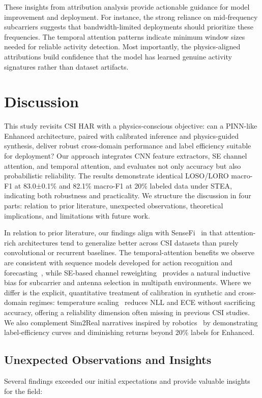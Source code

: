 \documentclass[journal]{IEEEtran}
\begin{document}
These insights from attribution analysis provide actionable guidance for model improvement and deployment. For instance, the strong reliance on mid-frequency subcarriers suggests that bandwidth-limited deployments should prioritize these frequencies. The temporal attention patterns indicate minimum window sizes needed for reliable activity detection. Most importantly, the physics-aligned attributions build confidence that the model has learned genuine activity signatures rather than dataset artifacts.

\section{Discussion}
This study revisits CSI HAR with a physics-conscious objective: can a PINN-like Enhanced architecture, paired with calibrated inference and physics-guided synthesis, deliver robust cross-domain performance and label efficiency suitable for deployment? Our approach integrates CNN feature extractors, SE channel attention, and temporal attention, and evaluates not only accuracy but also probabilistic reliability. The results demonstrate identical LOSO/LORO macro-F1 at 83.0±0.1\% and 82.1\% macro-F1 at 20\% labeled data under STEA, indicating both robustness and practicality. We structure the discussion in four parts: relation to prior literature, unexpected observations, theoretical implications, and limitations with future work.

In relation to prior literature, our findings align with SenseFi~\cite{yang2023sensefi} in that attention-rich architectures tend to generalize better across CSI datasets than purely convolutional or recurrent baselines. The temporal-attention benefits we observe are consistent with sequence models developed for action recognition and forecasting~\cite{li2020tea,bertasius2021timesformer,lim2021tft,zhou2021informer}, while SE-based channel reweighting~\cite{se_networks2018} provides a natural inductive bias for subcarrier and antenna selection in multipath environments. Where we differ is the explicit, quantitative treatment of calibration in synthetic and cross-domain regimes: temperature scaling~\cite{calibration_guo2017} reduces NLL and ECE without sacrificing accuracy, offering a reliability dimension often missing in previous CSI studies. We also complement Sim2Real narratives inspired by robotics~\cite{peng2018sim2real} by demonstrating label-efficiency curves and diminishing returns beyond 20\% labels for Enhanced.

\subsection{Unexpected Observations and Insights}
Several findings exceeded our initial expectations and provide valuable insights for the field:
\end{document}
